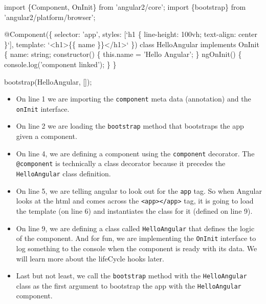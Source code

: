 \documentclass[12pt,]{article}
\newenvironment{Shaded}{}{}
\newcommand{\KeywordTok}[1]{\textcolor[rgb]{0.00,0.00,1.00}{{#1}}}
\newcommand{\FunctionTok}[1]{{#1}}
\newcommand{\NormalTok}[1]{{#1}}
\providecommand{\tightlist}{%
  \setlength{\itemsep}{0pt}\setlength{\parskip}{0pt}}
\begin{document}
\begin{Shaded}
\begin{Highlighting}[numbers=left,,]
\KeywordTok{import \{Component, OnInit\} from 'angular2/core';}
\KeywordTok{import \{bootstrap\} from 'angular2/platform/browser';}

\FunctionTok{@Component}\NormalTok{(\{}
  \NormalTok{selector: 'app',}
  \NormalTok{styles: [`h1 \{ line-height: 100vh; text-align: center \}`],}
  \NormalTok{template: `<h1>\{\{ name \}\}</h1>`}
\NormalTok{\})}
\KeywordTok{class} \NormalTok{HelloAngular }\KeywordTok{implements} \NormalTok{OnInit \{}
  \NormalTok{name: string;}
  \FunctionTok{constructor}\NormalTok{() \{ }\KeywordTok{this}\NormalTok{.}\FunctionTok{name} \NormalTok{= 'Hello Angular'; \}}
  \FunctionTok{ngOnInit}\NormalTok{() \{ console.}\FunctionTok{log}\NormalTok{('component linked'); \}}
\NormalTok{\}}

\FunctionTok{bootstrap}\NormalTok{(HelloAngular, []);}
\end{Highlighting}
\end{Shaded}

\begin{itemize}
\tightlist
\item
  On line 1 we are importing the \texttt{component} meta data
  (annotation) and the \texttt{onInit} interface.
\item
  On line 2 we are loading the \texttt{bootstrap} method that bootstraps
  the app given a component.
\item
  On line 4, we are defining a component using the \texttt{component}
  decorator. The \texttt{@component} is technically a class decorator
  because it precedes the \texttt{HelloAngular} class definition.
\item
  On line 5, we are telling angular to look out for the \texttt{app}
  tag. So when Angular looks at the html and comes across the
  \texttt{\textless{}app\textgreater{}\textless{}/app\textgreater{}}
  tag, it is going to load the template (on line 6) and instantiates the
  class for it (defined on line 9).
\item
  On line 9, we are defining a class called \texttt{HelloAngular} that
  defines the logic of the component. And for fun, we are implementing
  the \texttt{OnInit} interface to log something to the console when the
  component is ready with its data. We will learn more about the
  lifeCycle hooks later.
\item
  Last but not least, we call the \texttt{bootstrap} method with the
  \texttt{HelloAngular} class as the first argument to bootstrap the app
  with the \texttt{HelloAngular} component.
\end{itemize}
\end{document}
